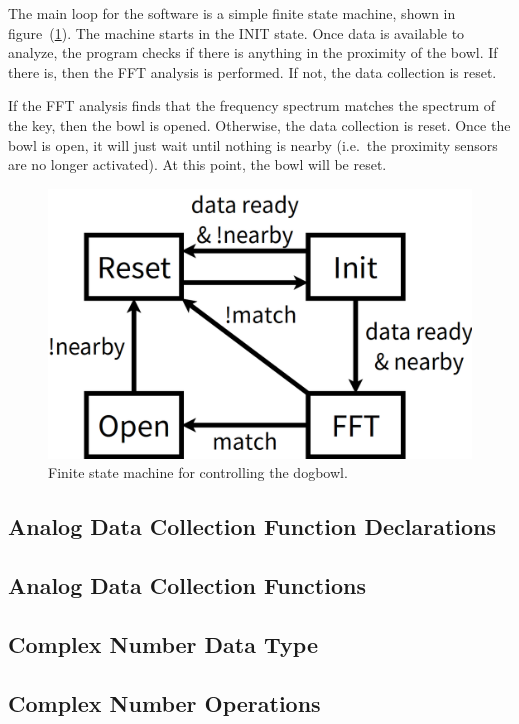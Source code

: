 \documentclass[10pt]{article}           %
\begin{document}
The main loop for the software is a simple finite state machine, shown in
figure~(\ref{fig:fsm}). The machine starts in the INIT state. Once data is
available to analyze, the program checks if there is anything in the proximity
of the bowl. If there is, then the FFT analysis is performed. If not, the data
collection is reset.

If the FFT analysis finds that the frequency spectrum matches the spectrum of
the key, then the bowl is opened. Otherwise, the data collection is reset. Once
the bowl is open, it will just wait until nothing is nearby (i.e.\ the proximity
sensors are no longer activated). At this point, the bowl will be reset.

\begin{figure}[h]
    \centering
    \includegraphics[width=0.4\linewidth]{sch/fsm.png}
    \caption{Finite state machine for controlling the dogbowl.}
\label{fig:fsm}
\end{figure}

\subsection{Analog Data Collection Function Declarations}
\label{sub:data_collection_function_declarations}



\subsection{Analog Data Collection Functions}
\label{sub:analog_data_collection_functions}



\subsection{Complex Number Data Type}
\label{sub:complex_number_data_type}



\subsection{Complex Number Operations}
\label{sub:complex_number_operations}
\end{document}
